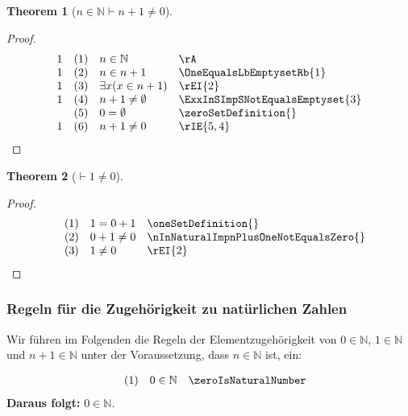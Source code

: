\documentclass{book}
\theoremstyle{plain}
\newtheorem{theorem}{Theorem}
\theoremstyle{remark}
\theoremstyle{definition}
\begin{document}
\label{nInNaturalImpnPlusOneNotEqualsZero}
\begin{theorem}[\(n\in\mathbb{N}\vdash n+1\neq 0\)]
\end{theorem}
\begin{proof}
	\[
	\begin{array}{llll}
		  1   & (1) & n\in\mathbb{N} & \rA\\
		1   & (2) & n\in n+1  & \OneEqualsLbEmptysetRb{1}\\
  		1   & (3) & \exists x(x\in n+1)  & \rEI{2}\\
        1   & (4) & n+1\neq \emptyset  & \ExxInSImpSNotEqualsEmptyset{3}\\
            & (5) & 0=\emptyset  & \zeroSetDefinition{}\\
        1   & (6) & n+1\neq 0  & \rIE{5,4}\\
	\end{array}
	\]
\end{proof}

\label{ImpOneNotEqualsZero}
\begin{theorem}[\(\vdash 1\neq 0\)]
\end{theorem}
\begin{proof}
	\[
	\begin{array}{llll}
		      & (1) & 1=0+1 & \oneSetDefinition{}\\
		    & (2) & 0+1\neq 0  & \nInNaturalImpnPlusOneNotEqualsZero{}\\
  		    & (3) & 1\neq 0  & \rEI{2}\\
	\end{array}
	\]
\end{proof}




\subsubsection{Regeln für die Zugehörigkeit zu natürlichen Zahlen}
\label{rule:zeroIsNaturalNumber} \label{rule:oneIsNaturalNumber} \label{rule:successorIsNaturalNumber}

Wir führen im Folgenden die Regeln der Elementzugehörigkeit von \(0 \in \mathbb{N}\), \(1 \in \mathbb{N}\) und \(n+1 \in \mathbb{N}\) unter der Voraussetzung, dass \(n \in \mathbb{N}\) ist, ein:

\[
\begin{array}{llll}
	& (1) & 0\in\mathbb{N} & \zeroIsNaturalNumber \\
\end{array}
\]
\textbf{Daraus folgt:} \(0 \in \mathbb{N}\).
\end{document}
